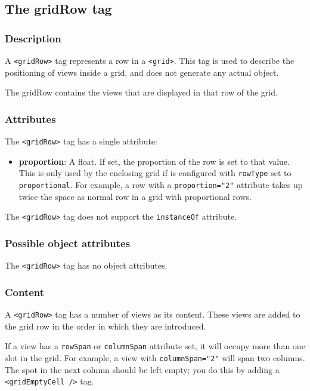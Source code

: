 \subsection{The gridRow tag}

\subsubsection{Description}
A \texttt{<gridRow>} tag represents a row in a \texttt{<grid>}.  This
tag is used to describe the positioning of views inside a grid, and
does not generate any actual object.

The gridRow contains the views that are displayed in that row of the
grid.

\subsubsection{Attributes}
The \texttt{<gridRow>} tag has a single attribute:
\begin{itemize}
\item {\bf proportion}: A float.  If set, the proportion of the row is
  set to that value.  This is only used by the enclosing grid if is
  configured with \texttt{rowType} set to \texttt{proportional}.  For
  example, a row with a \texttt{proportion="2"} attribute takes up
  twice the space as normal row in a grid with proportional rows.
\end{itemize}
The \texttt{<gridRow>} tag does not support the \texttt{instanceOf}
attribute.

\subsubsection{Possible object attributes}
The \texttt{<gridRow>} tag has no object attributes.

\subsubsection{Content}
A \texttt{<gridRow>} tag has a number of views as its content.  These
views are added to the grid row in the order in which they are
introduced.

If a view has a \texttt{rowSpan} or \texttt{columnSpan} attribute set,
it will occupy more than one slot in the grid.  For example, a view
with \texttt{columnSpan="2"} will span two columns.  The spot in the
next column should be left empty; you do this by adding a
\texttt{<gridEmptyCell />} tag.

